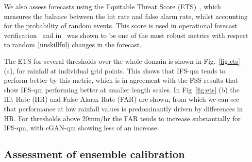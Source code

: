 \documentclass{article}
\begin{document}
We also assess forecasts using the Equitable Threat Score (ETS)~\citep{schaefer_critical_1990, wilks_forecast_2019}, which measures the balance between the hit rate and false alarm rate, whilst accounting for the probability of random events. This score is used in operational forecast verification~\citep{mittermaier_long-term_2013} and in~\cite{manzato_behaviour_2017} was shown to be one of the most robust metrics with respect to random (unskillful) changes in the forecast.

The ETS for several thresholds over the whole domain is shown in Fig.~\ref{fig:ets} (a), for rainfall at individual grid points. This shows that IFS-qm tends to perform better by this metric, which is in agreement with the FSS results that show IFS-qm performing better at smaller length scales. In Fig~\ref{fig:ets} (b) the Hit Rate (HR) and False Alarm Rate (FAR) are shown, from which we can see that performance at low rainfall values is predominantly driven by differences in HR. For thresholds above 20mm/hr the FAR tends to increase substantially for IFS-qm, with cGAN-qm showing less of an increase.

        
\subsection{Assessment of ensemble calibration}
\end{document}
